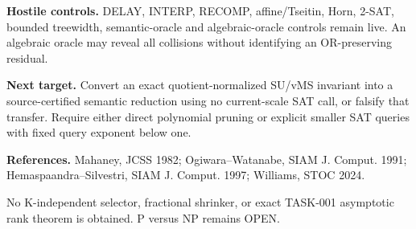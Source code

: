 \documentclass{article}
\begin{document}
\textbf{Hostile controls.} DELAY, INTERP, RECOMP, affine/Tseitin, Horn, 2-SAT, bounded treewidth, semantic-oracle and algebraic-oracle controls remain live. An algebraic oracle may reveal all collisions without identifying an OR-preserving residual.

\textbf{Next target.} Convert an exact quotient-normalized SU/vMS invariant into a source-certified semantic reduction using no current-scale SAT call, or falsify that transfer. Require either direct polynomial pruning or explicit smaller SAT queries with fixed query exponent below one.

\textbf{References.} Mahaney, JCSS 1982; Ogiwara--Watanabe, SIAM J. Comput. 1991; Hemaspaandra--Silvestri, SIAM J. Comput. 1997; Williams, STOC 2024.

No K-independent selector, fractional shrinker, or exact TASK-001 asymptotic rank theorem is obtained. P versus NP remains OPEN.
\end{document}
